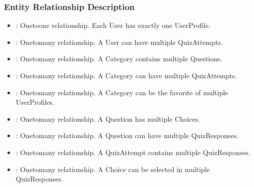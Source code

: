 \documentclass[letterpaper,10pt,english]{sphinxmanual}
\begin{document}
\subsubsection{Entity Relationship Description}
\label{\detokenize{models:entity-relationship-description}}\begin{itemize}
\item {} 
\sphinxAtStartPar
{}: One\sphinxhyphen{}to\sphinxhyphen{}one relationship. Each User has exactly one UserProfile.

\item {} 
\sphinxAtStartPar
{}: One\sphinxhyphen{}to\sphinxhyphen{}many relationship. A User can have multiple QuizAttempts.

\item {} 
\sphinxAtStartPar
{}: One\sphinxhyphen{}to\sphinxhyphen{}many relationship. A Category contains multiple Questions.

\item {} 
\sphinxAtStartPar
{}: One\sphinxhyphen{}to\sphinxhyphen{}many relationship. A Category can have multiple QuizAttempts.

\item {} 
\sphinxAtStartPar
{}: One\sphinxhyphen{}to\sphinxhyphen{}many relationship. A Category can be the favorite of multiple UserProfiles.

\item {} 
\sphinxAtStartPar
{}: One\sphinxhyphen{}to\sphinxhyphen{}many relationship. A Question has multiple Choices.

\item {} 
\sphinxAtStartPar
{}: One\sphinxhyphen{}to\sphinxhyphen{}many relationship. A Question can have multiple QuizResponses.

\item {} 
\sphinxAtStartPar
{}: One\sphinxhyphen{}to\sphinxhyphen{}many relationship. A QuizAttempt contains multiple QuizResponses.

\item {} 
\sphinxAtStartPar
{}: One\sphinxhyphen{}to\sphinxhyphen{}many relationship. A Choice can be selected in multiple QuizResponses.

\end{itemize}
\end{document}

